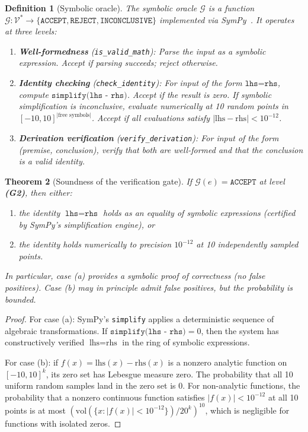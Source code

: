 \documentclass[11pt,a4paper]{article}
\newtheorem{theorem}{Theorem}[section]
\newtheorem{definition}[theorem]{Definition}
\newcommand{\cV}{\mathcal{V}}
\newcommand{\cG}{\mathcal{G}}
\begin{document}
\begin{definition}[Symbolic oracle]\label{def:oracle}
The symbolic oracle $\cG$ is a function
$\cG : \cV^* \to \{\texttt{ACCEPT}, \texttt{REJECT}, \texttt{INCONCLUSIVE}\}$
implemented via SymPy~\cite{Meurer2017}.
It operates at three levels:
\begin{enumerate}[label=\textbf{(G\arabic*)},nosep]
\item \textbf{Well-formedness} (\texttt{is\_valid\_math}):
  Parse the input as a symbolic expression.
  Accept if parsing succeeds; reject otherwise.
\item \textbf{Identity checking} (\texttt{check\_identity}):
  For input of the form $\texttt{lhs=rhs}$,
  compute $\texttt{simplify(lhs - rhs)}$.
  Accept if the result is zero.
  If symbolic simplification is inconclusive,
  evaluate numerically at 10 random points
  in $[-10, 10]^{|\text{free symbols}|}$.
  Accept if all evaluations satisfy
  $|\text{lhs} - \text{rhs}| < 10^{-12}$.
\item \textbf{Derivation verification} (\texttt{verify\_derivation}):
  For input of the form (premise, conclusion),
  verify that both are well-formed and that the
  conclusion is a valid identity.
\end{enumerate}
\end{definition}

\begin{theorem}[Soundness of the verification gate]\label{thm:soundness}
If $\cG(e) = \texttt{ACCEPT}$ at level \textbf{(G2)},
then either:
\begin{enumerate}[label=(\alph*),nosep]
\item the identity $\texttt{lhs} = \texttt{rhs}$ holds
  as an equality of symbolic expressions (certified by SymPy's
  simplification engine), or
\item the identity holds numerically to precision $10^{-12}$
  at 10 independently sampled points.
\end{enumerate}
In particular, case (a) provides a symbolic proof of correctness
(no false positives).
Case (b) may in principle admit false positives, but the
probability is bounded.
\end{theorem}

\begin{proof}
For case (a): SymPy's \texttt{simplify} applies a deterministic
sequence of algebraic transformations.
If $\texttt{simplify(lhs - rhs)} = 0$, then the system has
constructively verified $\text{lhs} = \text{rhs}$
in the ring of symbolic expressions.

For case (b): if $f(x) = \text{lhs}(x) - \text{rhs}(x)$
is a nonzero analytic function on $[-10,10]^k$, its zero set
has Lebesgue measure zero.
The probability that all 10 uniform random samples land in the
zero set is $0$.
For non-analytic functions, the probability that a nonzero
continuous function satisfies $|f(x)| < 10^{-12}$ at all 10
points is at most
$\left(\text{vol}(\{x : |f(x)| < 10^{-12}\}) / 20^k\right)^{10}$,
which is negligible for functions with isolated zeros.
\end{proof}
\end{document}
